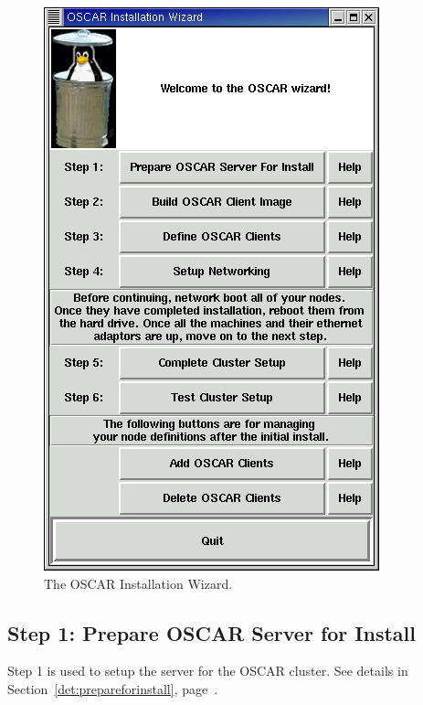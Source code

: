 \begin{figure}[ht!]
  \begin{center}
    \centerline{\includegraphics[scale=\imgscale]{figs/2_sbs-oscar-wizard}}
    \caption{The OSCAR Installation Wizard.}
    \label{fig:sbs-install-wizard}
  \end{center}
\end{figure}



\subsection{Step 1: Prepare OSCAR Server for Install}

Step 1 is used to setup the server for the OSCAR cluster.  See details
in Section~\ref{det:prepareforinstall},
page~\pageref{det:prepareforinstall}. 


